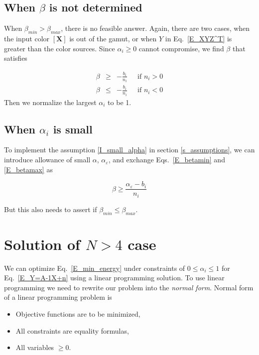 \documentclass[dvipdfmx,a4paper]{article}
\begin{document}
\subsection{When $\beta$ is not determined}

When $\beta_{min} > \beta_{max}$, there is no feasible answer. Again, there are two cases, when the input color $[\boldsymbol{X}]$ is out of the gamut, or when $Y$ in Eq.~\eqref{E_XYZ^T} is greater than the color sources. Since $\alpha_i \geq 0$ cannot compromise, we find $\beta$ that satisfies

\begin{eqnarray}
  \beta & \geq & - \frac{b_i}{n_i} \;\;\;\; \text{ if \(n_i > 0\)} \label{E_beta0min} \\
  \beta & \leq & - \frac{b_i}{n_i} \;\;\;\; \text{ if \(n_i < 0\)} \label{E_beta0miax}
\end{eqnarray}
Then we normalize the largest $\alpha_i$ to be 1.

\subsection{When $\alpha_i$ is small}

To implement the assumption \ref{I_small_alpha} in section \ref{s_assumptions}, we can introduce allowance of small $\alpha$, $\alpha_\varepsilon$, and exchange Eqs.~\eqref{E_betamin} and \eqref{E_betamax} as

\begin{equation}
  \beta \geq \frac{\alpha_\varepsilon - b_i}{n_i}
\end{equation}

But this also needs to assert if $\beta_{min} \leq \beta_{max}$.




\section{Solution of $N > 4$ case}
We can optimize Eq.~\eqref{E_min_energy} under constraints of $0 \leq \alpha_i \leq 1$ for Eq.~\eqref{E_Y=A-1X+n} using a linear programming solution\cite{LP_NRC}.
To use linear programming we need to rewrite our problem into the \textit{normal form}. Normal form of a linear programming problem is

\begin{itemize}
  \item Objective functions are to be minimized,
  \item All constraints are equality formulas,
  \item All variables $ \geq 0$.
\end{itemize}
\end{document}
